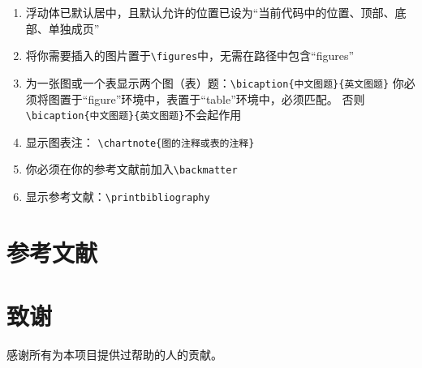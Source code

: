 \documentclass{bjfuthesis}
\begin{document}
\begin{enumerate}
\begin{verbatim}
	\subsection{三级标题 1.2.1}
	正文文字
	……
\end{verbatim}
\item 浮动体已默认居中，且默认允许的位置已设为“当前代码中的位置、顶部、底部、单独成页”
\item 将你需要插入的图片置于\verb|\figures|中，无需在路径中包含“figures”
\item 为一张图或一个表显示两个图（表）题：\verb|\bicaption{中文图题}{英文图题}|
你必须将图置于“figure”环境中，表置于“table”环境中，必须匹配。
否则\verb|\bicaption{中文图题}{英文图题}|不会起作用
\item 显示图表注： \verb|\chartnote{图的注释或表的注释}|
\item 你必须在你的参考文献前加入\verb|\backmatter|
\item 显示参考文献：\verb|\printbibliography|
\end{enumerate}
	\backmatter
    \chapter{参考文献}
	\chapter{致谢}
感谢所有为本项目提供过帮助的人的贡献。
\end{document}
